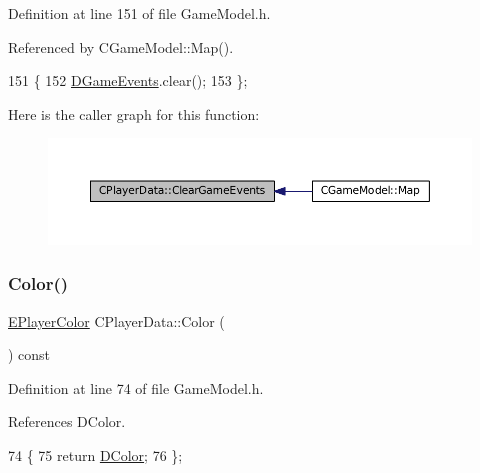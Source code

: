 Definition at line 151 of file Game\+Model.\+h.



Referenced by C\+Game\+Model\+::\+Map().


\begin{DoxyCode}
151                               \{
152             \hyperlink{classCPlayerData_a9a7af43e88055d6d1a384a8817a655a0}{DGameEvents}.clear();  
153         \};
\end{DoxyCode}
Here is the caller graph for this function\+:\nopagebreak
\begin{figure}[H]
\begin{center}
\leavevmode
\includegraphics[width=350pt]{classCPlayerData_a74cbe8bf72037ca113c9c40ae7bca5ec_icgraph}
\end{center}
\end{figure}
\hypertarget{classCPlayerData_a4f313db2728a8be2b24484515a2445df}{}\label{classCPlayerData_a4f313db2728a8be2b24484515a2445df} 
\subsubsection{\texorpdfstring{Color()}{Color()}}
{\footnotesize\ttfamily \hyperlink{GameDataTypes_8h_aafb0ca75933357ff28a6d7efbdd7602f}{E\+Player\+Color} C\+Player\+Data\+::\+Color (\begin{DoxyParamCaption}{ }\end{DoxyParamCaption}) const\hspace{0.3cm}{\ttfamily [inline]}}



Definition at line 74 of file Game\+Model.\+h.



References D\+Color.


\begin{DoxyCode}
74                                   \{
75             \textcolor{keywordflow}{return} \hyperlink{classCPlayerData_a65d69aaa09c8fc0f7ddfa5e858313085}{DColor};
76         \};
\end{DoxyCode}
\hypertarget{classCPlayerData_a4d203da2adbd6d00b0cd5b334bddba4f}{}\label{classCPlayerData_a4d203da2adbd6d00b0cd5b334bddba4f} 
